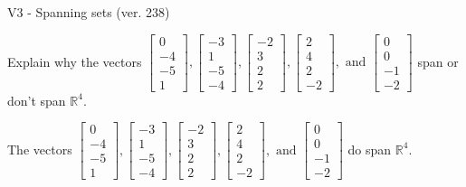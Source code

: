 \begin{exercise}
  \begin{exerciseTitle}V3 - Spanning sets (ver. 238)\end{exerciseTitle}
  \begin{exerciseStatement}
    Explain why the vectors \(\left[\begin{array}{r}
0 \\
-4 \\
-5 \\
1
\end{array}\right] , \left[\begin{array}{r}
-3 \\
1 \\
-5 \\
-4
\end{array}\right] , \left[\begin{array}{r}
-2 \\
3 \\
2 \\
2
\end{array}\right] , \left[\begin{array}{r}
2 \\
4 \\
2 \\
-2
\end{array}\right] , \text{ and } \left[\begin{array}{r}
0 \\
0 \\
-1 \\
-2
\end{array}\right]\) span or don't span \(\mathbb{R}^4\). 
	


  \end{exerciseStatement}
  \begin{exerciseAnswer}
   The vectors \(\left[\begin{array}{r}
0 \\
-4 \\
-5 \\
1
\end{array}\right] , \left[\begin{array}{r}
-3 \\
1 \\
-5 \\
-4
\end{array}\right] , \left[\begin{array}{r}
-2 \\
3 \\
2 \\
2
\end{array}\right] , \left[\begin{array}{r}
2 \\
4 \\
2 \\
-2
\end{array}\right] , \text{ and } \left[\begin{array}{r}
0 \\
0 \\
-1 \\
-2
\end{array}\right]\) 
  	 do  
	span \(\mathbb{R}^4\).
  



\end{exerciseAnswer}
\end{exercise}
